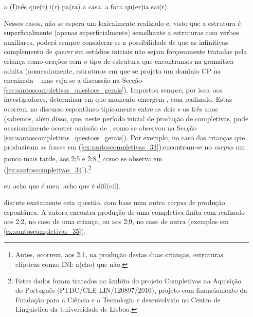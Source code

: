 \documentclass[output=paper]{LSP/langsci}
\begin{document}
\ea\label{ex:santoscompletivas_33}
\ea\label{ex:santoscompletivas_33a} a  (I)nês que(r) i(r) pa(ra) a casa.
\ex\label{ex:santoscompletivas_33b} a foca qu(er)ia sai(r).
\zl

Nesses casos, não se espera um  lexicalmente realizado e, visto que a estrutura é superficialmente (apenas superficialmente) semelhante a estruturas com verbos auxiliares, poderá sempre considerar-se a possibilidade de que as infinitivas complemento de \textit{querer} em estádios iniciais não sejam forçosamente tratadas pela criança como orações com o tipo de estrutura que encontramos na gramática adulta (nomeadamente, estruturas em que se projeta um domínio CP na encaixada – mas veja-se a discussão na Secção \ref{sec:santoscompletivas_questoes_gerais}). Importou sempre, por isso, aos investigadores, determinar em que momento emergem , com  realizado. Estas ocorrem no discurso espontâneo tipicamente entre os dois e os três anos (sabemos, além disso, que, neste período inicial de produção de completivas, pode ocasionalmente ocorrer omissão de , como se observou na Secção \ref{sec:santoscompletivas_questoes_gerais}). Por exemplo, no caso das crianças que produziram as frases em (\ref{ex:santoscompletivas_33}),\largerpage[2] encontram-se no \textit{corpus}  um pouco mais tarde, aos 2;5 e 2;8,\footnote{Antes, ocorrem, aos 2;1, na produção destas duas crianças, estruturas elípticas como:
\ea\label{ex:santoscompletivas_i3}INI: a(cho) que não.
\z\vspace*{-\baselineskip}} como se observa em (\ref{ex:santoscompletivas_34}).\footnote{Estes dados foram tratados no âmbito do projeto Completivas na Aquisição do Português (PTDC/CLE-LIN/120897/2010), projeto com financiamento da Fundação para a Ciência e a Tecnologia e desenvolvido no Centro de Linguística da Universidade de Lisboa.}

\ea\label{ex:santoscompletivas_34}
\ea\label{ex:santoscompletivas_34a} eu acho que é meu.
\ex\label{ex:santoscompletivas_34b} acho que é difí(cil).
\zl

\citet{soares2006} discute exatamente esta questão, com base num outro \textit{corpus} de produção espontânea. A autora encontra produção de uma completiva finita com  realizado aos 2;2, no caso de uma criança, ou aos 2;9, no caso de outra (exemplos em \ref{ex:santoscompletivas_35}). 
\end{document}
